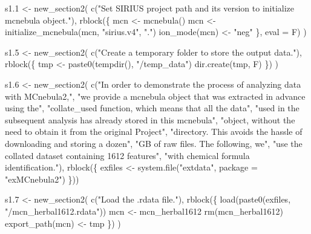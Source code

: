 \documentclass[
]{article}
\newenvironment{Shaded}{\begin{snugshade}}{\end{snugshade}}
\newcommand{\AttributeTok}[1]{\textcolor[rgb]{0.77,0.63,0.00}{#1}}
\newcommand{\FloatTok}[1]{\textcolor[rgb]{0.00,0.00,0.81}{#1}}
\newcommand{\FunctionTok}[1]{\textcolor[rgb]{0.00,0.00,0.00}{#1}}
\newcommand{\NormalTok}[1]{#1}
\newcommand{\OtherTok}[1]{\textcolor[rgb]{0.56,0.35,0.01}{#1}}
\newcommand{\StringTok}[1]{\textcolor[rgb]{0.31,0.60,0.02}{#1}}
\begin{document}
\begin{Shaded}
\begin{Highlighting}[]
\NormalTok{s1}\FloatTok{.1} \OtherTok{\textless{}{-}} \FunctionTok{new\_section2}\NormalTok{(}
  \FunctionTok{c}\NormalTok{(}\StringTok{"Set SIRIUS project path and its version to initialize mcnebula object."}\NormalTok{),}
  \FunctionTok{rblock}\NormalTok{(\{}
\NormalTok{    mcn }\OtherTok{\textless{}{-}} \FunctionTok{mcnebula}\NormalTok{()}
\NormalTok{    mcn }\OtherTok{\textless{}{-}} \FunctionTok{initialize\_mcnebula}\NormalTok{(mcn, }\StringTok{"sirius.v4"}\NormalTok{, }\StringTok{"."}\NormalTok{)}
    \FunctionTok{ion\_mode}\NormalTok{(mcn) }\OtherTok{\textless{}{-}} \StringTok{"neg"}
\NormalTok{  \}, }\AttributeTok{eval =}\NormalTok{ F)}
\NormalTok{)}

\NormalTok{s1}\FloatTok{.5} \OtherTok{\textless{}{-}} \FunctionTok{new\_section2}\NormalTok{(}
  \FunctionTok{c}\NormalTok{(}\StringTok{"Create a temporary folder to store the output data."}\NormalTok{),}
  \FunctionTok{rblock}\NormalTok{(\{}
\NormalTok{    tmp }\OtherTok{\textless{}{-}} \FunctionTok{paste0}\NormalTok{(}\FunctionTok{tempdir}\NormalTok{(), }\StringTok{"/temp\_data"}\NormalTok{)}
    \FunctionTok{dir.create}\NormalTok{(tmp, F)}
\NormalTok{  \})}
\NormalTok{)}

\NormalTok{s1}\FloatTok{.6} \OtherTok{\textless{}{-}} \FunctionTok{new\_section2}\NormalTok{(}
  \FunctionTok{c}\NormalTok{(}\StringTok{"In order to demonstrate the process of analyzing data with MCnebula2,"}\NormalTok{,}
    \StringTok{"we provide a \textquotesingle{}mcnebula\textquotesingle{} object that was extracted in advance using the"}\NormalTok{,}
    \StringTok{"\textasciigrave{}collate\_used\textasciigrave{} function, which means that all the data"}\NormalTok{,}
    \StringTok{"used in the subsequent analysis has already stored in this \textquotesingle{}mcnebula\textquotesingle{}"}\NormalTok{,}
    \StringTok{"object, without the need to obtain it from the original Project"}\NormalTok{,}
    \StringTok{"directory. This avoids the hassle of downloading and storing a dozen"}\NormalTok{,}
    \StringTok{"GB of raw files. The following, we"}\NormalTok{,}
    \StringTok{"use the collated dataset containing 1612 features"}\NormalTok{,}
    \StringTok{"with chemical formula identification."}\NormalTok{),}
  \FunctionTok{rblock}\NormalTok{(\{}
\NormalTok{    exfiles }\OtherTok{\textless{}{-}} \FunctionTok{system.file}\NormalTok{(}\StringTok{"extdata"}\NormalTok{, }\AttributeTok{package =} \StringTok{"exMCnebula2"}\NormalTok{)}
\NormalTok{  \}))}

\NormalTok{s1}\FloatTok{.7} \OtherTok{\textless{}{-}} \FunctionTok{new\_section2}\NormalTok{(}
  \FunctionTok{c}\NormalTok{(}\StringTok{"Load the \textquotesingle{}.rdata\textquotesingle{} file."}\NormalTok{),}
  \FunctionTok{rblock}\NormalTok{(\{}
    \FunctionTok{load}\NormalTok{(}\FunctionTok{paste0}\NormalTok{(exfiles, }\StringTok{"/mcn\_herbal1612.rdata"}\NormalTok{))}
\NormalTok{    mcn }\OtherTok{\textless{}{-}}\NormalTok{ mcn\_herbal1612}
    \FunctionTok{rm}\NormalTok{(mcn\_herbal1612)}
    \FunctionTok{export\_path}\NormalTok{(mcn) }\OtherTok{\textless{}{-}}\NormalTok{ tmp}
\NormalTok{  \})}
\NormalTok{)}


\end{Highlighting}
\end{Shaded}
\end{document}
